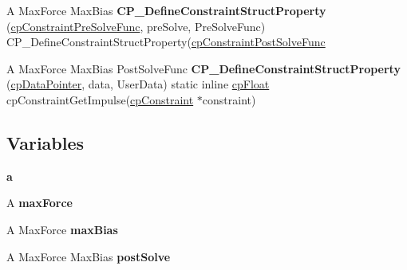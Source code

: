 \begin{DoxyCompactItemize}
\item 
\hypertarget{group__cp_constraint_ga8b7f106925117454bdd245ac832f5916}{A Max\-Force Max\-Bias {\bfseries C\-P\-\_\-\-Define\-Constraint\-Struct\-Property} (\hyperlink{group__cp_constraint_ga31a2ad1ca9b9ecd4124a81b1292714e0}{cp\-Constraint\-Pre\-Solve\-Func}, pre\-Solve, Pre\-Solve\-Func) C\-P\-\_\-\-Define\-Constraint\-Struct\-Property(\hyperlink{group__cp_constraint_ga1adf3ccceb908229069aa2f10f21c1b1}{cp\-Constraint\-Post\-Solve\-Func}}\label{group__cp_constraint_ga8b7f106925117454bdd245ac832f5916}

\item 
\hypertarget{group__cp_constraint_ga91481e468e7a57c080ad49276e84641c}{A Max\-Force Max\-Bias Post\-Solve\-Func {\bfseries C\-P\-\_\-\-Define\-Constraint\-Struct\-Property} (\hyperlink{group__basic_types_ga2ac2c3c31e21893941f9e4f8ee279447}{cp\-Data\-Pointer}, data, User\-Data) static inline \hyperlink{group__basic_types_gac1ed65573e035bf892505768c852d8d3}{cp\-Float} cp\-Constraint\-Get\-Impulse(\hyperlink{structcp_constraint}{cp\-Constraint} $\ast$constraint)}\label{group__cp_constraint_ga91481e468e7a57c080ad49276e84641c}

\end{DoxyCompactItemize}
\subsection*{Variables}
\begin{DoxyCompactItemize}
\item 
\hypertarget{group__cp_constraint_ga4124bc0a9335c27f086f24ba207a4912}{{\bfseries a}}\label{group__cp_constraint_ga4124bc0a9335c27f086f24ba207a4912}

\item 
\hypertarget{group__cp_constraint_ga4cc761ae8cb7444a20057c323b9c77d1}{A {\bfseries max\-Force}}\label{group__cp_constraint_ga4cc761ae8cb7444a20057c323b9c77d1}

\item 
\hypertarget{group__cp_constraint_ga0b6cc86c51fce3adfe1997930c4f17f3}{A Max\-Force {\bfseries max\-Bias}}\label{group__cp_constraint_ga0b6cc86c51fce3adfe1997930c4f17f3}

\item 
\hypertarget{group__cp_constraint_gad4e5c23945cdc36db49b3cd99a053ff7}{A Max\-Force Max\-Bias {\bfseries post\-Solve}}\label{group__cp_constraint_gad4e5c23945cdc36db49b3cd99a053ff7}

\end{DoxyCompactItemize}


